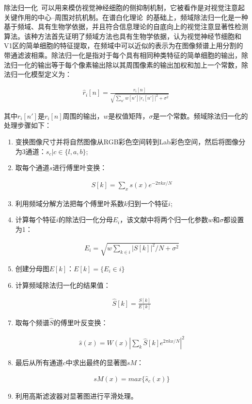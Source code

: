 除法归一化~\cite{BianCognNeurodyn2010Visual}可以用来模仿视觉神经细胞的侧抑制机制，它被看作是对视觉注意起关键作用的中心--周围对抗机制。在谱白化理论~\cite{Bian2009Biological}的基础上，频域除法归一化是一种基于频域、具有生物学依据，并且符合信息理论的自底向上的视觉注意显著性检测算法。该种方法首先证明了频域方法也具有生物学依据，认为视觉神经节细胞和V1区的简单细胞的特征提取，在频域中可以近似的表示为在图像频谱上用分割的带通滤波相乘。除法归一化是指对于每个具有相同种类特征的简单细胞的输出，除法归一化的输出等于每个像素输出除以其周围像素的输出加权和加上一个常数，除法归一化模型定义为：
\begin{linenomath}
\begin{align}
\hat{r}_{i}[n]=\frac{r_{i}[n]}{\sqrt{\sum_{n'}w[n']|r_{i}[n']|^{2}+\sigma^{2}}}
\label{式3_14}
\end{align}
\end{linenomath}
其中$r_{i}[n']$是$r_{i}[n]$周围的输出，$w$是权值矩阵，$\sigma$是一个常数。频域除法归一化的处理步骤如下：
\begin{enumerate}
\item 变换图像尺寸并将自然图像从RGB彩色空间转到Lab彩色空间，然后将图像分为3通道：$s_{c}|c\in\{l,a,b\}$;
\item 取每个通道$s$进行傅里叶变换：
\begin{linenomath}
\begin{align}
S[k]=\sum_{x}s(x)e^{-2\pi kx/N}
\label{式3_15}
\end{align}
\end{linenomath}
\item 利用频域分解方法把每个傅里叶系数$k$归到一个特征$i$;
\item 计算每个特征$i$的除法归一化分母$E_{i}$，该文献中将两个归一化参数$w$和$\sigma$都设置为1：
\begin{linenomath}
\begin{align}
E_{i}=\sqrt{w\sum_{k\in i}|S[k]|^{2}/N+\sigma^{2}}
\label{式3_16}
\end{align}
\end{linenomath}
\item 创建分母图$E[k]$：$E[k]=\{E_{i}\in i\}$
\item 计算频域除法归一化的结果值：
\begin{linenomath}
\begin{align}
\hat{S}[k]=\frac{S[k]}{E[k]}
\label{式3_17}
\end{align}
\end{linenomath}
\item 取每个频谱$\hat{S}$的傅里叶反变换：
\begin{linenomath}
\begin{align}
\hat{s}(x)=W(x)|\sum_{k}\hat{S}[k]e^{2\pi kx/N}|^{2}
\label{式3_18}
\end{align}
\end{linenomath}
\item 最后从所有通道$c$中求出最终的显著图$sM$：
\begin{linenomath}
\begin{align}
sM(x)=max\{\hat{s}_{c}(x)\}
\label{式3_19}
\end{align}
\end{linenomath}
\item 利用高斯滤波器对显著图进行平滑处理。
\end{enumerate}
